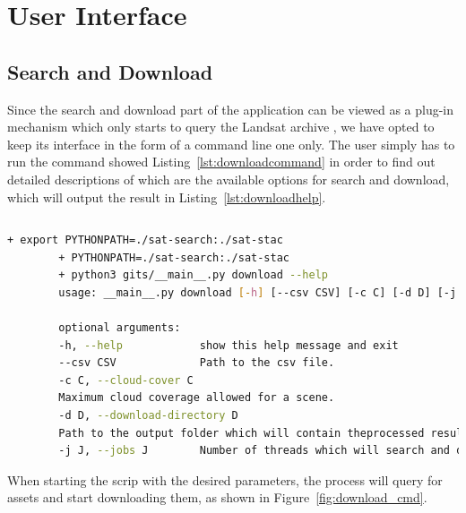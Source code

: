 \documentclass[12pt, a4paper]{report}
\begin{document}
	\vfill

	\chapter{User Interface}
	\label{seq:gui}
	
	\section{Search and Download}
	\label{subsec:search_download}
	
	\par Since the search and download part of the application can be viewed as a plug-in mechanism which only starts to query the Landsat archive , we have opted to keep its interface in the form of a command line one only. The user simply has to run the command showed Listing~\ref{lst:downloadcommand} in order to find out detailed descriptions of which are the available options for search and download, which will output the result in Listing~\ref{lst:downloadhelp}.
	
	\begin{lstlisting}[caption={Help command for sarch and download.},label={lst:downloadcommand},language=Bash]
		% bash -x run_download.sh --help
	\end{lstlisting}
	
	\begin{lstlisting}[caption={Detailed parameters required for the download script.},label={lst:downloadhelp},language=Bash]
		+ export PYTHONPATH=./sat-search:./sat-stac
		+ PYTHONPATH=./sat-search:./sat-stac
		+ python3 gits/__main__.py download --help
		usage: __main__.py download [-h] [--csv CSV] [-c C] [-d D] [-j J]
		
		optional arguments:
		-h, --help            show this help message and exit
		--csv CSV             Path to the csv file.
		-c C, --cloud-cover C
		Maximum cloud coverage allowed for a scene.
		-d D, --download-directory D
		Path to the output folder which will contain theprocessed results.
		-j J, --jobs J        Number of threads which will search and download.
	\end{lstlisting}

	When starting the scrip with the desired parameters, the process will query for assets and start downloading them, as shown in Figure~\ref{fig:download_cmd}.
	
\end{document}

